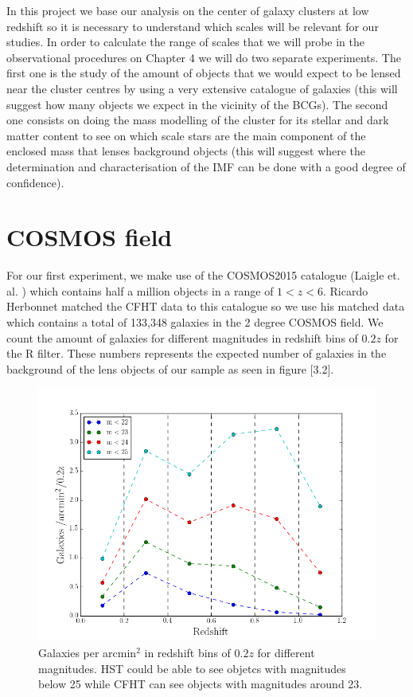 In this project we base our analysis on the center of galaxy clusters at low redshift so it is necessary to understand which scales will be relevant for our studies. In order to calculate the range of scales that we will probe in the observational procedures on Chapter 4 we will do two separate experiments. The first one is the study of the amount of objects that we would expect to be lensed near the cluster centres by using a very extensive catalogue of galaxies (this will suggest how many objects we expect in the vicinity of the BCGs). The second one consists on doing the mass modelling of the cluster for its stellar and dark matter content to see on which scale stars are the main component of the enclosed mass that lenses background objects (this will suggest where the determination and characterisation of the IMF can be done with a good degree of confidence).

\section{COSMOS field}

For our first experiment, we make use of the COSMOS2015 catalogue (Laigle et. al. \citeyear{Reference21}) which contains half a million objects in a range of $1<z<6$. Ricardo Herbonnet matched the CFHT data to this catalogue so we use his matched data which contains a total of 133,348 galaxies in the 2 degree COSMOS field. We count the amount of galaxies for different magnitudes in redshift bins of $0.2z$ for the R filter. These numbers represents the expected number of galaxies in the background of the lens objects of our sample as seen in figure [3.2]. 

\begin{figure}[H]
\centering
\includegraphics[width=12cm]{images/galaxies_per_arcmin.png}
\caption[Galaxies per arcmin]{Galaxies per arcmin$^2$ in redshift bins of $0.2z$ for different magnitudes. HST could be able to see objetcs with magnitudes below 25 while CFHT can see objects with magnitudes around 23.}
\end{figure}

